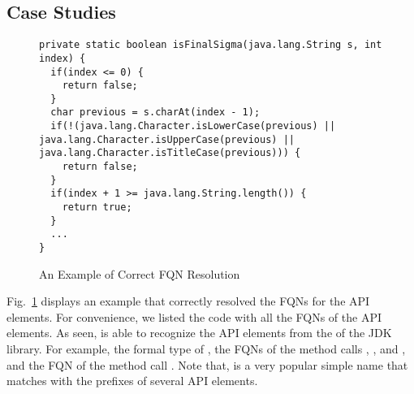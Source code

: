 \subsection{Case Studies}

\begin{figure}[t]
	\centering
\begin{lstlisting}[]
private static boolean isFinalSigma(java.lang.String s, int index) {
  if(index <= 0) {
    return false;
  }
  char previous = s.charAt(index - 1);
  if(!(java.lang.Character.isLowerCase(previous) || java.lang.Character.isUpperCase(previous) || java.lang.Character.isTitleCase(previous))) {
    return false;
  }
  if(index + 1 >= java.lang.String.length()) {
    return true;
  }
  ...
}
\end{lstlisting}
        \vspace{-12pt}
        \caption{An Example of Correct FQN Resolution}
        \label{fig:ex1}
\end{figure}

Fig.~\ref{fig:ex1} displays an example that {\tool} correctly resolved
the FQNs for the API elements. For convenience, we listed the code
with all the FQNs of the API elements. As seen, {\tool} is able to
recognize the API elements from the  of the JDK
library. For example, the formal type  of , the
FQNs of the method calls , , and
, and the FQN of the method call .
Note that,  is a very popular simple name that matches
with the prefixes of several API elements.


